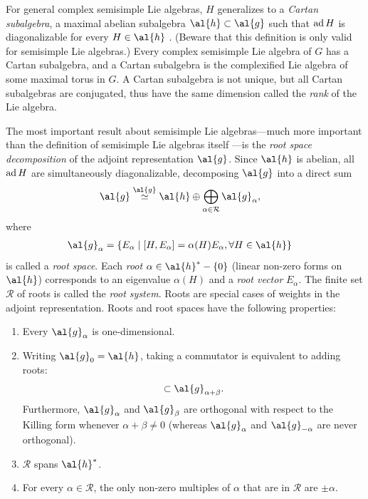 For general complex semisimple Lie algebras, $H$ generalizes to a \emph{Cartan subalgebra}, a maximal abelian subalgebra $\al{h} \subset \al{g}$ such that $\text{ad}\, H$ is diagonalizable for every $H \in \al{h}$ \cite[Proposition 2.13, p.136]{Knapp}. (Beware that this definition is only valid for semisimple Lie algebras.)
Every complex semisimple Lie algebra of $G$ has a Cartan subalgebra, and a Cartan subalgebra is the complexified Lie algebra of some maximal torus in $G$. A Cartan subalgebra is not unique, but all Cartan subalgebras are conjugated, thus have the same dimension called the \emph{rank} of the Lie algebra.

The most important result about semisimple Lie algebras---much more important than the definition of semisimple Lie algebras itself \cite{Kirillov}---is the \emph{root space decomposition} of the adjoint representation $\al{g}$. Since $\al{h}$ is abelian, all $\text{ad}\, H$ are simultaneously diagonalizable, decomposing $\al{g}$ into a direct sum
\begin{align}
\al{g} &\stackrel{\al{g}}{\simeq} \al{h} \oplus \bigoplus_{\alpha \in \mathcal{R}}\al{g}_{\alpha},
\end{align}
where
\begin{align}
	 \al{g}_{\alpha} &= \{ E_{\alpha} \mid [H,E_{\alpha}] = \alpha(H) E_{\alpha}, \forall H \in \al{h} \}
\end{align}
is called a \emph{root space}. Each \emph{root} $\alpha \in \al{h}^* - \{0\}$ (linear non-zero forms on $\al{h}$) corresponds to an eigenvalue $\alpha(H)$ and a \emph{root vector} $E_{\alpha}$. The finite set $\mathcal{R}$ of roots is called the \emph{root system}. Roots are special cases of weights in the adjoint representation. Roots and root spaces have the following properties:
\begin{enumerate}
	
	\item Every $\al{g}_{\alpha}$ is one-dimensional.
	
	\item\label{root-space-orthogonality} Writing $\al{g}_0 = \al{h}$, taking a commutator is equivalent to adding roots:
	\begin{align}
	[\al{g}_{\alpha} , \al{g}_{\beta}] \subset \al{g}_{\alpha+\beta}.
	\end{align}
	Furthermore, $\al{g}_{\alpha}$ and $\al{g}_{\beta}$ are orthogonal with respect to the Killing form whenever $\alpha + \beta \neq 0$ (whereas $\al{g}_{\alpha}$ and $\al{g}_{-\alpha}$ are never orthogonal).
	
	\item\label{root-span} $\mathcal{R}$ spans $\al{h}^*$.
	
	\item\label{positive-root} For every $\alpha \in \mathcal{R}$, the only non-zero multiples of $\alpha$ that are in $\mathcal{R}$ are $\pm \alpha$.
	
\end{enumerate}
